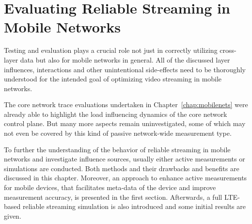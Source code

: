 \chapter{Evaluating Reliable Streaming in Mobile Networks}
\label{chap:mobilestreaming-measurements}

Testing and evaluation plays a crucial role not just in correctly utilizing cross-layer data but also for mobile networks in general. All of the discussed layer influences, interactions and other unintentional side-effects need to be thoroughly understood for the intended goal of optimizing video streaming in mobile networks.

The core network trace evaluations undertaken in Chapter~\ref{chap:mobilenets} were already able to highlight the load influencing dynamics of the core network control plane. But many more aspects remain uninvestigated, some of which may not even be covered by this kind of passive network-wide measurement type.

To further the understanding of the behavior of reliable streaming in mobile networks and investigate influence sources, usually either active measurements or simulations are conducted. Both methods and their drawbacks and benefits are discussed in this chapter. Moreover, an approach to enhance active measurements for mobile devices, that facilitates meta-data of the device and improve measurement accuracy, is presented in the first section. Afterwards, a full \gls{LTE}-based reliable streaming simulation is also introduced and some initial results are given.


















